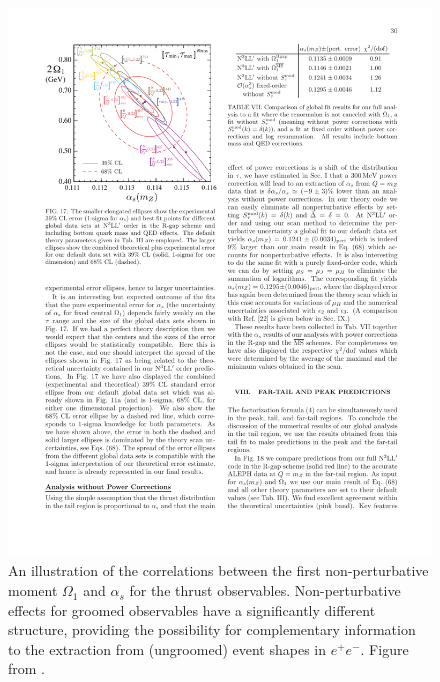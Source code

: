   

\begin{figure}
\begin{center}
\includegraphics[width = 0.6\columnwidth]{figures/correlation_firstmoment.pdf}
\end{center}
\caption{An illustration of the correlations between the first non-perturbative moment $\Omega_1$ and $\alpha_s$ for the thrust observables. Non-perturbative effects for groomed observables have a significantly different structure, providing the possibility for complementary information to the extraction from (ungroomed) event shapes in $e^+e^-$. Figure from \cite{Abbate:2010xh}.}
\label{fig:correlation_firstmoment}
\end{figure}



